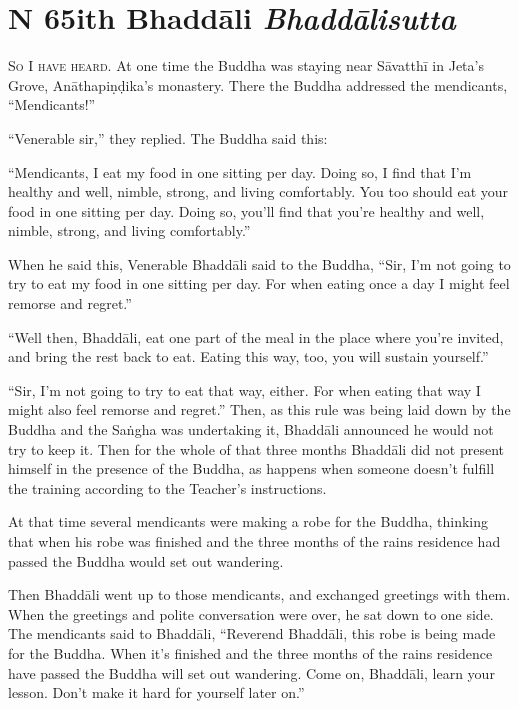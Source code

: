 \documentclass[12pt,openany]{book}%
\newcommand*{\suttatitleacronym}[1]{\smaller[2]{#1}\vspace*{.3em}}
\newcommand*{\suttatitletranslation}[1]{\linebreak{#1}}
\newcommand*{\suttatitleroot}[1]{\linebreak\smaller[2]\itshape{#1}}
\newcommand*{\tocacronym}[1]{\hspace*{-3.3em}{#1}\quad}
\newcommand*{\toctranslation}[1]{#1}
\newcommand*{\tocroot}[1]{(\textit{#1})}
\newcommand*{\scevam}[1]{\textsc{#1}}
\begin{document}
%
\section*{{\suttatitleacronym MN 65}{\suttatitletranslation With Bhaddāli }{\suttatitleroot Bhaddālisutta}}
\addcontentsline{toc}{section}{\tocacronym{MN 65} \toctranslation{With Bhaddāli } \tocroot{Bhaddālisutta}}

\scevam{So I have heard. }At one time the Buddha was staying near \textsanskrit{Sāvatthī} in Jeta’s Grove, \textsanskrit{Anāthapiṇḍika}’s monastery. There the Buddha addressed the mendicants, “Mendicants!” 

“Venerable sir,” they replied. The Buddha said this: 

“Mendicants, I eat my food in one sitting per day. Doing so, I find that I’m healthy and well, nimble, strong, and living comfortably. You too should eat your food in one sitting per day. Doing so, you’ll find that you’re healthy and well, nimble, strong, and living comfortably.” 

When he said this, Venerable \textsanskrit{Bhaddāli} said to the Buddha, “Sir, I’m not going to try to eat my food in one sitting per day. For when eating once a day I might feel remorse and regret.” 

“Well then, \textsanskrit{Bhaddāli}, eat one part of the meal in the place where you’re invited, and bring the rest back to eat. Eating this way, too, you will sustain yourself.” 

“Sir, I’m not going to try to eat that way, either. For when eating that way I might also feel remorse and regret.” Then, as this rule was being laid down by the Buddha and the \textsanskrit{Saṅgha} was undertaking it, \textsanskrit{Bhaddāli} announced he would not try to keep it. Then for the whole of that three months \textsanskrit{Bhaddāli} did not present himself in the presence of the Buddha, as happens when someone doesn’t fulfill the training according to the Teacher’s instructions. 

At that time several mendicants were making a robe for the Buddha, thinking that when his robe was finished and the three months of the rains residence had passed the Buddha would set out wandering. 

Then \textsanskrit{Bhaddāli} went up to those mendicants, and exchanged greetings with them. When the greetings and polite conversation were over, he sat down to one side. The mendicants said to \textsanskrit{Bhaddāli}, “Reverend \textsanskrit{Bhaddāli}, this robe is being made for the Buddha. When it’s finished and the three months of the rains residence have passed the Buddha will set out wandering. Come on, \textsanskrit{Bhaddāli}, learn your lesson. Don’t make it hard for yourself later on.” 
\end{document}
